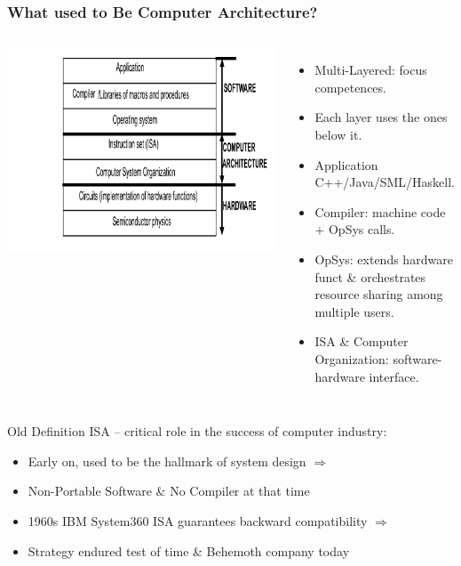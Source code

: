 \documentclass{beamer}
\newcommand{\emp}[1]{\textcolor{DikuRed}{ #1}}
\begin{document}
\begin{frame}[fragile,t]
\frametitle{What used to Be Computer Architecture?}

\begin{columns}\hspace{-8ex}
\includegraphics[width=44ex]{Ch1Figs/SysOrg}
\vspace{-3ex}
\begin{itemize}
    \item Multi-Layered: focus competences.
    \item Each layer uses the ones below it.
    \item \emp{Application} C++/Java/SML/Haskell.
    \item \emp{Compiler}: machine code + OpSys calls.
    \item \emp{OpSys}: extends hardware funct \&
              orchestrates resource sharing among multiple users.
    \item \emp{ISA \& Computer Organization}: 
            software-hardware interface. 
\end{itemize}
\end{columns}

\emp{Old Definition} ISA -- critical role in the success of computer industry:
\begin{itemize}
    \item Early on, used to be the hallmark of system design $\Rightarrow$
    \item Non-Portable Software \& No Compiler at that time
    \item 1960s IBM System360 ISA guarantees backward compatibility $\Rightarrow$
    \item Strategy endured test of time \& Behemoth company today
\end{itemize}
\end{frame}
\end{document}
